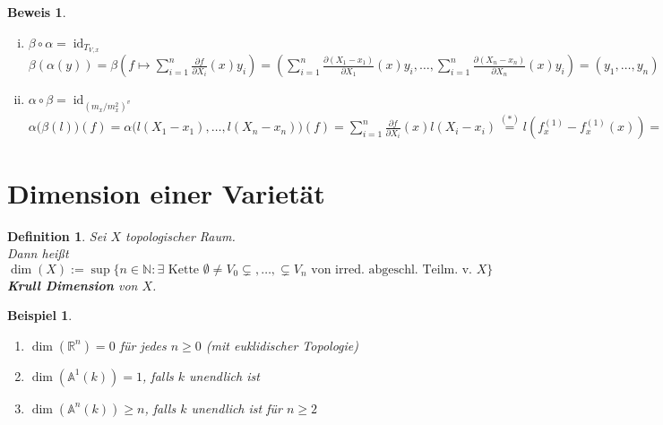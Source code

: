 \documentclass[a4paper,12pt]{report}
\theoremstyle{break}
\newtheorem{Def}{Definition}[section]
\theoremstyle{nonumberbreak}
\newtheorem{nnBsp}{Beispiel}
\newtheorem{Bew}{Beweis}
\theoremstyle{nonumberplain}
\newcommand{\emp}[1]{\textbf{\emph{#1}}}
\newcommand{\begriff}[1]{{\index{#1}}\emp{#1}}
\DeclareMathOperator{\id}{id}
\newcommand{\R}{\mathbb{R}}
\newcommand{\N}{\mathbb{N}}
\newcommand{\A}{\mathbb{A}}
\begin{document}
\begin{Bew}
\begin{enumerate}[i)]
	\emph{Zu zeigen:} $\left(l(\overline{X_1-x_1}),\ldots ,l(\overline{X_n-x_n})\right) \in T_{V,x}$\\
	Sei dazu $f\in I(V)$. \emph{Zu zeigen:} $f_x^{(1)}\left(l(\overline{X_1-x_1}),\ldots ,l(\overline{X_n-x_n})\right)=0$\\
	Es ist $f_x^{(1)}\left(l(\overline{X_1-x_1}),\ldots ,l(\overline{X_n-x_n})\right)= \sum\limits_{i=1}^n \frac{\partial f}{\partial X_i}(x)l(\overline{X_i-x_i})$ $= l\left(\sum\limits_{i=1}^n \frac{\partial f}{\partial X_i}(x)(X_i-x_i)\right)$ $\overset{(*)}{=}$ $l\left( f_x^{(1)}-f_x^{(1)}(x) \right) = 0$, wegen\\
	\emph{Behauptung:} $f_x^{(1)}-f_x^{(1)}(x)\in m_x^2$\\
	\emph{denn:} Taylor-Entwicklung $\underbrace{f}_{0\text{ in }k[V]}= \underbrace{f(x)}_{=0\text{, weil }f\in I(V)}+f_x^{(1)}-f_x^{(1)}(x)+ $Terme in $m_x^2$
\item
	$\beta\circ\alpha=\id_{T_{V,x}}$\\
	$\beta(\alpha(y))= \beta(f\mapsto\sum\limits_{i=1}^n\frac{\partial f}{\partial X_i}(x)y_i) = \left(\sum\limits_{i=1}^n\frac{\partial(X_1-x_1)}{\partial X_1}(x)y_i,\ldots ,\sum\limits_{i=1}^n\frac{\partial(X_n-x_n)}{\partial X_n}(x)y_i\right) = (y_1,\ldots ,y_n)$
\item
	$\alpha\circ\beta=\id_{(m_x/m_x^2)^v}$\\
	$\alpha\bigl(\beta(l)\bigr)(f)= \alpha\bigl(l(X_1-x_1),\ldots ,l(X_n-x_n)\bigr)(f) = \sum\limits_{i=1}^n\frac{\partial f}{\partial X_i}(x)l(X_i-x_i) \overset{(*)}{=} l\left(f_x^{(1)}-f_x^{(1)}(x)\right) = f(\overline f)$
\end{enumerate}\end{Bew}

\newpage


\section{Dimension einer Variet\"at}

\begin{Def}
Sei $X$ topologischer Raum.\\
Dann hei\ss t
	\[\dim(X):=\sup\{n\in\N:\exists\text{ Kette }\emptyset\ne V_0\subsetneq,\ldots ,\subsetneq V_n\text{ von irred. abgeschl. Teilm. v. }X\}\]
	\begriff{Krull Dimension} von $X$.
\end{Def}

\begin{nnBsp}\begin{enumerate}[1)]
\item
	$\dim(\R^n)=0$ f\"ur jedes $n\ge0$ (mit euklidischer Topologie)
\item
	$\dim(\A^1(k))=1$, falls $k$ unendlich ist
\item
	$\dim(\A^n(k))\ge n$, falls $k$ unendlich ist f\"ur $n\ge2$
\end{enumerate}\end{nnBsp}
\end{document}
